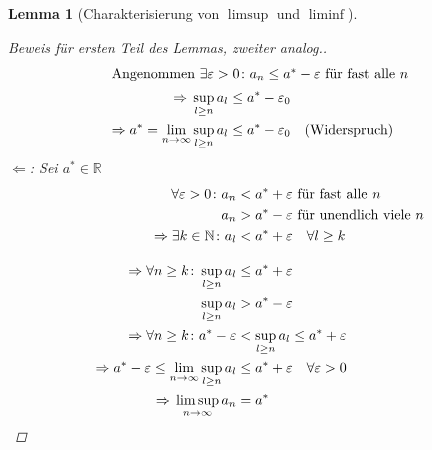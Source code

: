 \documentclass[11pt, twoside, a4paper]{article}
\theoremstyle{plain}
\newtheorem{lemma}[blockelement]{Lemma}
\newcommand{\impl}[0]{\Rightarrow{}}
\newcommand{\anf}[1]{\glqq{}#1\grqq}
\newcommand{\fromto}{\rightarrow{}}
\newcommand{\naturalnumbers}{\mathbb{N}}
\newcommand{\realnumbers}{\mathbb{R}}
\begin{document}
\begin{lemma}[Charakterisierung von $\limsup$ und $\liminf$]
\begin{proof}[Beweis für ersten Teil des Lemmas, zweiter analog.]
\begin{align*}
                \intertext{Angenommen $\exists \varepsilon > 0\colon a_n \leq a^{*} -\varepsilon$ für fast alle $n$}
                \impl \sup_{l\geq n} a_l &\leq a^{*} - \varepsilon_0\\
                \impl a^{*} = \lim_{n\fromto\infty} \sup_{l\geq n} a_l &\leq a^{*} - \varepsilon_0\quad\text{(Widerspruch)}
            \end{align*}
            \anf{$\Leftarrow$}: Sei $a^{*}\in\realnumbers$
            \begin{align*}
                \forall \varepsilon > 0\colon a_n &< a^{*} + \varepsilon\text{ für fast alle $n$}\\
                a_n &> a^{*} - \varepsilon\text{ für unendlich viele $n$}\\
                \impl \exists k\in\naturalnumbers\colon a_l &< a^{*} + \varepsilon\quad\forall l\geq k\\[10pt]
                \impl \forall n\geq k\colon \sup_{l\geq n} a_l &\leq a^{*} + \varepsilon\\
                \sup_{l\geq n} a_l &> a^{*} - \varepsilon\\
                \impl \forall n \geq k\colon a^{*} - \varepsilon &< \sup_{l\geq n} a_l \leq a^{*} + \varepsilon\\
                \impl a^{*} - \varepsilon \leq \lim_{n\fromto\infty} \sup_{l\geq n} a_l &\leq a^{*} + \varepsilon\quad \forall \varepsilon > 0\\
                \impl \limsup_{n\fromto\infty} a_n &= a^{*}\qedhere
            \end{align*}
        \end{proof}
    \end{lemma}
\end{document}
